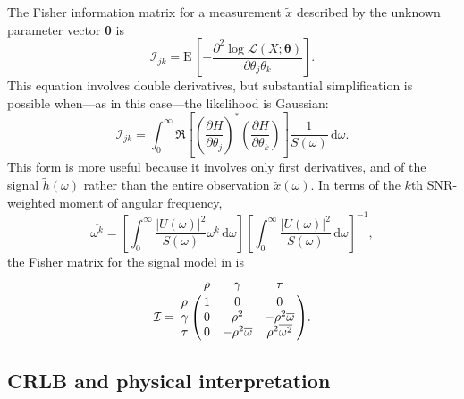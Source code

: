 \documentclass{iopart}
\begin{document}
The Fisher information matrix for a measurement $\tilde x$ described by the unknown parameter vector $\boldsymbol{\theta}$ is
%
\begin{equation}\label{eq:general-fisher-matrix}
	\mathcal{I}_{jk} = \mathrm{E} \, \left[
		-\frac{\partial^2 \log
			\mathcal{L}(X ; \boldsymbol\theta)}
			{\partial \theta_j \theta_k}
	\right].
\end{equation}
%
This equation involves double derivatives, but substantial simplification is possible when---as in this case---the likelihood is Gaussian:
%
\begin{equation}\label{eq:gaussian-fisher-matrix}
	\mathcal{I}_{jk} = \int_0^\infty \Re \left[
        \left(\frac{\partial H}{\partial \theta_j}\right)^*
        \left(\frac{\partial H}{\partial \theta_k}\right)
	\right] \frac{1}{S(\omega)} \, \mathrm{d}\omega.
\end{equation}
%
This form is more useful because it involves only first derivatives, and of the signal $\tilde h (\omega)$ rather than the entire observation $\tilde x (\omega)$. In terms of the $k$th \ac{SNR}-weighted moment of angular frequency,
%
\begin{equation}\label{eq:angular-frequency-moments}
    \overline{\omega^k} =
        \left[ \int_0^\infty \frac{|U (\omega)|^2}{S(\omega)} \omega^k \, \mathrm{d}\omega \right]
        \left[ \int_0^\infty \frac{|U (\omega)|^2}{S(\omega)} \, \mathrm{d}\omega \right]^{-1},
\end{equation}
%
the Fisher matrix for the signal model in  is
%
\begin{equation}\label{eq:fisher-matrix}
	\mathcal{I} = \bordermatrix{
        ~ & \rho & \gamma & \tau \cr
        \rho & 1 & 0 & 0 \cr
        \gamma & 0 & \rho^2 & -\rho^2 \overline{\omega} \cr
        \tau & 0 & -\rho^2 \overline{\omega} & \rho^2 \overline{\omega^2}
    }.
\end{equation}

\subsection{\acl{CRLB} and physical interpretation}
\end{document}
